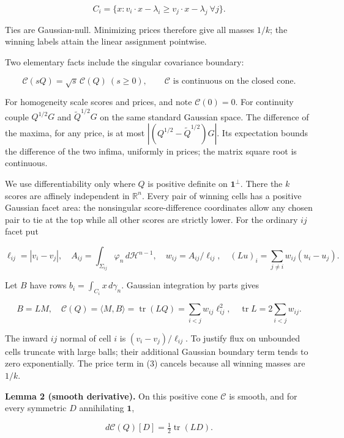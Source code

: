 \documentclass[11pt]{article}
\begin{document}
\[
 C_i=\{x:v_i\cdot x-\lambda_i\ge v_j\cdot x-\lambda_j\ \forall j\}.
                                                               \tag{4}
\]

Ties are Gaussian-null. Minimizing prices therefore give all masses
\(1/k\); the winning labels attain the linear assignment pointwise.

Two elementary facts include the singular covariance boundary:

\[
 \mathcal C(sQ)=\sqrt{s}\,\mathcal C(Q)\ (s\ge0),
 \qquad \mathcal C\text{ is continuous on the closed cone}.       \tag{5}
\]

For homogeneity scale scores and prices, and note \(\mathcal C(0)=0\).
For continuity couple \(Q^{1/2}G\) and \(\widetilde Q^{1/2}G\) on the
same standard Gaussian space. The difference of the maxima, for any
price, is at most \(|(Q^{1/2}-\widetilde Q^{1/2})G|\). Its expectation
bounds the difference of the two infima, uniformly in prices; the matrix
square root is continuous.

We use differentiability only where \(Q\) is positive definite on
\(\mathbf1^\perp\). There the \(k\) scores are affinely independent in
\(\mathbb R^n\). Every pair of winning cells has a positive Gaussian
facet area: the nonsingular score-difference coordinates allow any
chosen pair to tie at the top while all other scores are strictly lower.
For the ordinary \(ij\) facet put

\[
 \ell_{ij}=|v_i-v_j|,
 \quad A_{ij}=\int_{\Sigma_{ij}}\varphi_n\,d\mathcal H^{n-1},
 \quad w_{ij}=A_{ij}/\ell_{ij},
 \quad (Lu)_i=\sum_{j\ne i}w_{ij}(u_i-u_j).               \tag{6}
\]

Let \(B\) have rows \(b_i=\int_{C_i}x\,d\gamma_n\). Gaussian integration
by parts gives

\[
 B=LM,\quad \mathcal C(Q)=\langle M,B\rangle
      =\operatorname{tr}(LQ)=\sum_{i<j}w_{ij}\ell_{ij}^2,
 \quad \operatorname{tr}L=2\sum_{i<j}w_{ij}.             \tag{7}
\]

The inward \(ij\) normal of cell \(i\) is \((v_i-v_j)/\ell_{ij}\). To
justify flux on unbounded cells truncate with large balls; their
additional Gaussian boundary term tends to zero exponentially. The price
term in (3) cancels because all winning masses are \(1/k\).

\textbf{Lemma 2 (smooth derivative).} On this positive cone
\(\mathcal C\) is smooth, and for every symmetric \(D\) annihilating
\(\mathbf1\),

\[
 d\mathcal C(Q)[D]=\tfrac12\operatorname{tr}(LD).         \tag{8}
\]
\end{document}
